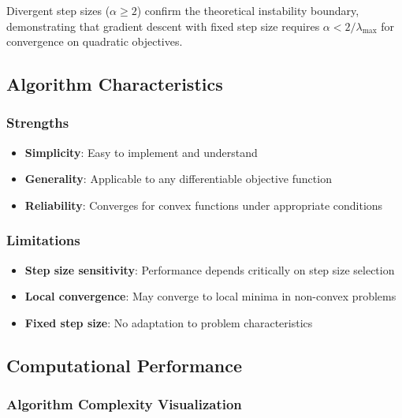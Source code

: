 \documentclass[
  english,
]{article}
\providecommand{\tightlist}{%
  \setlength{\itemsep}{0pt}\setlength{\parskip}{0pt}}
\begin{document}
Divergent step sizes (\(\alpha \geq 2\)) confirm the theoretical
instability boundary, demonstrating that gradient descent with fixed
step size requires \(\alpha < 2/\lambda_{\max}\) for convergence on
quadratic objectives.

\subsection{Algorithm Characteristics}\label{algorithm-characteristics}

\subsubsection{Strengths}\label{strengths}

\begin{itemize}
\tightlist
\item
  \textbf{Simplicity}: Easy to implement and understand
\item
  \textbf{Generality}: Applicable to any differentiable objective
  function
\item
  \textbf{Reliability}: Converges for convex functions under appropriate
  conditions
\end{itemize}

\subsubsection{Limitations}\label{limitations}

\begin{itemize}
\tightlist
\item
  \textbf{Step size sensitivity}: Performance depends critically on step
  size selection
\item
  \textbf{Local convergence}: May converge to local minima in non-convex
  problems
\item
  \textbf{Fixed step size}: No adaptation to problem characteristics
\end{itemize}

\subsection{Computational Performance}\label{computational-performance}

\subsubsection{Algorithm Complexity
Visualization}\label{algorithm-complexity-visualization}
\end{document}
